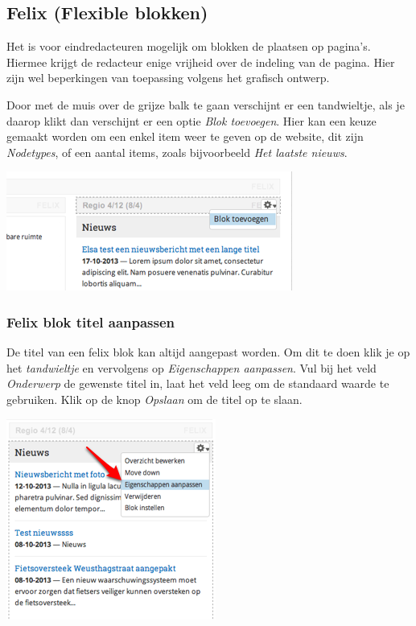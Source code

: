 
\subsection{Felix (Flexible blokken)}\label{felix}
Het is voor eindredacteuren mogelijk om blokken de plaatsen op pagina's. Hiermee krijgt de redacteur enige vrijheid over de indeling van de pagina. Hier zijn wel beperkingen van toepassing volgens het grafisch ontwerp.

Door met de muis over de grijze balk te gaan verschijnt er een tandwieltje, als je daarop klikt dan verschijnt er een optie \emph{Blok toevoegen}. Hier kan een keuze gemaakt worden om een enkel item weer te geven op de website, dit zijn \emph{Nodetypes}, of een aantal items, zoals bijvoorbeeld \emph{Het laatste nieuws}.

\begin{center}
	\includegraphics[width=\textwidth]{img/felix.png}
\end{center}

\subsubsection{Felix blok titel aanpassen}\label{felixbloktitel}

De titel van een felix blok kan altijd aangepast worden. Om dit te doen klik je op het \emph{tandwieltje} en vervolgens op \emph{Eigenschappen aanpassen}. Vul bij het veld \emph{Onderwerp} de gewenste titel in, laat het veld leeg om de standaard waarde te gebruiken. Klik op de knop \emph{Opslaan} om de titel op te slaan. 

\begin{center}
	\includegraphics[scale=1.0]{img/felix0.png}
\end{center}

